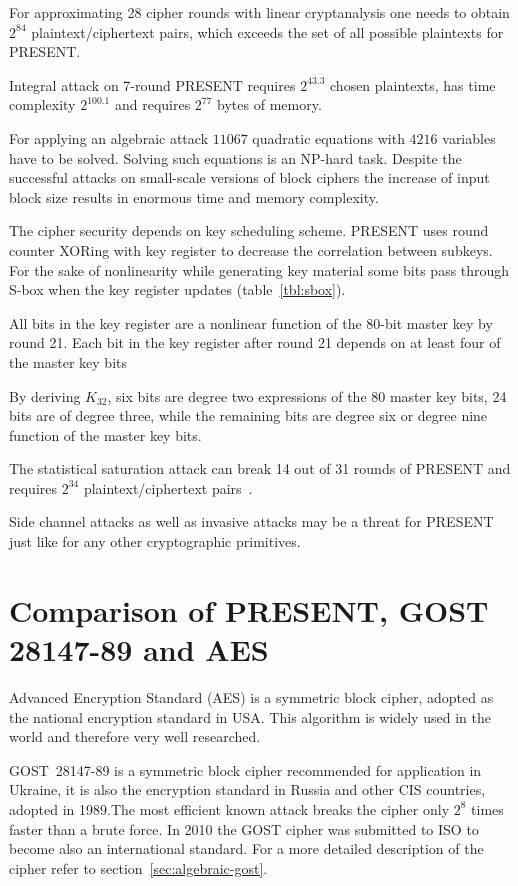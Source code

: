 For approximating 28 cipher rounds with linear cryptanalysis one needs to obtain
$ 2^{84} $ \mbox{plaintext/ciphertext} pairs, which exceeds the set of all
possible plaintexts for PRESENT.

Integral attack on 7-round PRESENT requires $ 2^{43.3} $ chosen
plaintexts, has time complexity $ 2^{100.1} $ and requires $ 2^{77} $ bytes of
memory.

For applying an algebraic attack $ 11067 $ quadratic equations with $ 4216 $
variables have to be solved. Solving such equations is an NP-hard task.
Despite the successful attacks on small-scale versions of block ciphers the
increase of input block size results in enormous time and memory complexity.

The cipher security depends on key scheduling scheme. PRESENT uses round
counter XORing with key register to decrease the correlation between subkeys.
For the sake of nonlinearity while generating key material some bits pass
through S-box when the key register updates (table~\ref{tbl:sbox}). 

All bits in the key register are a nonlinear function of the 80-bit master key
by round 21. Each bit in the key register after round 21 depends on at least
four of the master key bits

By deriving $ K_{32} $, six bits are degree two expressions of the 80 master key
bits, 24 bits are of degree three, while the remaining bits are degree six or
degree nine function of the master key bits.

The statistical saturation attack can break 14 out of 31 rounds of
PRESENT and requires $ 2^{34} $ \mbox{plaintext/ciphertext}
pairs~\cite{collard:present}.

Side channel attacks as well as invasive attacks may be a threat for
PRESENT just like for any other cryptographic primitives.

\section{Comparison of PRESENT, GOST 28147-89 and AES}
\label{sec:lwc-comparison}

Advanced Encryption Standard (AES) is a symmetric block cipher, adopted
as the national encryption standard in USA. This algorithm is widely used in
the world and therefore very well researched.

GOST~28147-89 is a symmetric block cipher recommended for application in
Ukraine, it is also the encryption standard in Russia and other CIS countries,
adopted in 1989.The most efficient known attack breaks the cipher
only $ 2^8 $ times faster than a brute force. In 2010 the
GOST cipher was submitted to ISO to become also an international
standard. For a more detailed description of the cipher refer to
section~\ref{sec:algebraic-gost}.

